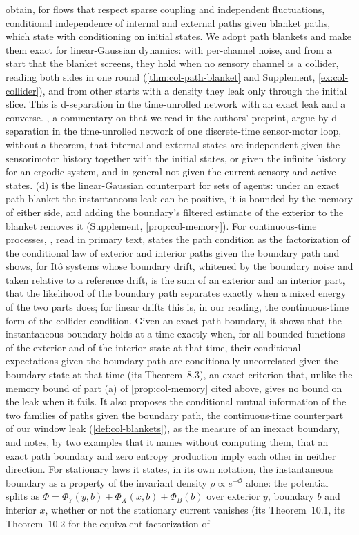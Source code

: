 \citet{friston2023path} obtain, for flows that respect sparse coupling and independent fluctuations, conditional independence of internal and external paths given blanket paths, which \citet{friston2023simpler} state with conditioning on initial states. We adopt path blankets and make them exact for linear-Gaussian dynamics: with per-channel noise, and from a start that the blanket screens, they hold when no sensory channel is a collider, reading both sides in one round (\cref{thm:col-path-blanket} and Supplement, \cref{ex:col-collider}), and from other starts with a density they leak only through the initial slice. This is d-separation in the time-unrolled network \citep{pearl1988probabilistic} with an exact leak and a converse. \citet{virgo2022embracing}, a commentary on \citet{bruineberg2022emperors} that we read in the authors' preprint, argue by d-separation in the time-unrolled network of one discrete-time sensor-motor loop, without a theorem, that internal and external states are independent given the sensorimotor history together with the initial states, or given the infinite history for an ergodic system, and in general not given the current sensory and active states. (d) is the linear-Gaussian counterpart for sets of agents: under an exact path blanket the instantaneous leak can be positive, it is bounded by the memory of either side, and adding the boundary's filtered estimate of the exterior to the blanket removes it (Supplement, \cref{prop:col-memory}). For continuous-time processes, \citet{sakthivadivel2026nonequilibrium}, read in primary text, states the path condition as the factorization of the conditional law of exterior and interior paths given the boundary path and shows, for It\^o systems whose boundary drift, whitened by the boundary noise and taken relative to a reference drift, is the sum of an exterior and an interior part, that the likelihood of the boundary path separates exactly when a mixed energy of the two parts does; for linear drifts this is, in our reading, the continuous-time form of the collider condition. Given an exact path boundary, it shows that the instantaneous boundary holds at a time exactly when, for all bounded functions of the exterior and of the interior state at that time, their conditional expectations given the boundary path are conditionally uncorrelated given the boundary state at that time (its Theorem~8.3), an exact criterion that, unlike the memory bound of part (a) of \cref{prop:col-memory} cited above, gives no bound on the leak when it fails. It also proposes the conditional mutual information of the two families of paths given the boundary path, the continuous-time counterpart of our window leak (\cref{def:col-blankets}), as the measure of an inexact boundary, and notes, by two examples that it names without computing them, that an exact path boundary and zero entropy production imply each other in neither direction. For stationary laws it states, in its own notation, the instantaneous boundary as a property of the invariant density $\rho\propto e^{-\Phi}$ alone: the potential splits as $\Phi=\Phi_Y(y,b)+\Phi_X(x,b)+\Phi_B(b)$ over exterior $y$, boundary $b$ and interior $x$, whether or not the stationary current vanishes (its Theorem~10.1, its Theorem~10.2 for the equivalent factorization of 